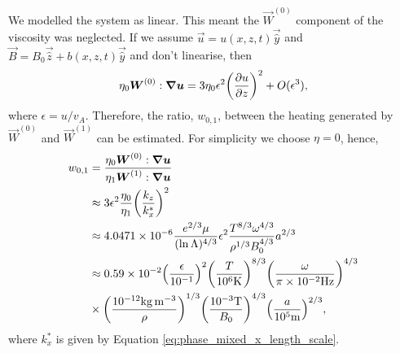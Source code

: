 We modelled the system as linear. This meant the $\vec{W}^{(0)}$ component of the viscosity was neglected. If we assume $\vec{u}=u(x,z,t)\vec{\hat{y}}$ and $\vec{B}=B_0\vec{\hat{z}} + b(x,z,t)\vec{\hat{y}}$ and don't linearise, then
\begin{equation}
    \eta_0\boldsymbol{W}^{(0)}:\grad{\boldsymbol{u}} = 3\eta_0\epsilon^2\qty(\pdv{u}{z})^2 + O(\epsilon^3),
\end{equation}
where $\epsilon=u/v_A$.
Therefore, the ratio, $w_{0,1}$, between the heating generated by $\vec{W}^{(0)}$ and $\vec{W}^{(1)}$ can be estimated. For simplicity we choose $\eta=0$, hence,
\begin{equation}
\label{eq:w01}
\begin{aligned}
    w_{0,1} &= \frac{\eta_0\vec{W}^{(0)}:\grad{\vec{u}}}{\eta_1\vec{W}^{(1)}:\grad{\vec{u}}} \\
    &\approx 3\epsilon^2\frac{\eta_0}{\eta_1}\qty(\frac{k_z}{k_x^*})^2 \\
    &\approx 4.0471\times10^{-6}\frac{e^{2/3}\mu}{(\ln\Lambda)^{4/3}}\epsilon^2\frac{T^{8/3}\omega^{4/3}}{\rho^{1/3}B_0^{4/3}}a^{2/3} \\
    &\approx 0.59\times10^{-2}\qty(\frac{\epsilon}{10^{-1}})^2\qty(\frac{T}{10^{6}\si{.K}})^{8/3}\qty(\frac{\omega}{\pi\times10^{-2}\si{.Hz}})^{4/3}\\
    &\times\qty(\frac{10^{-12}\si{.kg.m^{-3}}}{\rho})^{1/3}\qty(\frac{10^{-3}\si{.T}}{B_0})^{4/3}\qty(\frac{a}{10^5\si{.m}})^{2/3},
\end{aligned}
\end{equation}
where $k_x^*$ is given by Equation \eqref{eq:phase_mixed_x_length_scale}.

